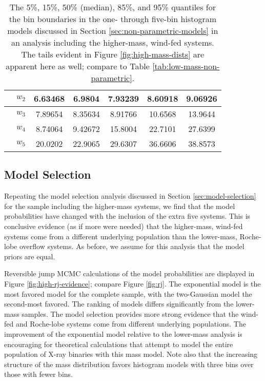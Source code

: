 \documentclass[preprint]{aastex}
\begin{document}
\begin{table}
\begin{center}
\begin{tabular}{|c|c|c|c|c|c|c|}
      \hline
      & $w_2$ & 6.63468 & 6.9804 & 7.93239 & 8.60918 & 9.06926 \\
      \hline
      & $w_3$ & 7.89654 & 8.35634 & 8.91766 & 10.6568 & 13.9644 \\
      \hline
      & $w_4$ & 8.74064 & 9.42672 & 15.8004 & 22.7101 & 27.6399 \\
      \hline
      & $w_5$ & 20.0202 & 22.9065 & 29.6307 & 36.6606 & 38.8573 \\
      \hline
    \end{tabular}
  \end{center}
  \caption{\label{tab:high-mass-non-parametric} The 5\%, 15\%, 50\%
    (median), 85\%, and 95\% quantiles for the bin boundaries in the
    one- through five-bin histogram models discussed in Section
    \ref{sec:non-parametric-models} in an 
    analysis including the higher-mass, wind-fed systems.  
    The tails evident in Figure \ref{fig:high-mass-dists} are apparent
    here as well; compare to Table \ref{tab:low-mass-non-parametric}.}
\end{table}

\subsection{Model Selection}

Repeating the model selection analysis discussed in Section
\ref{sec:model-selection} for the sample including the higher-mass
systems, we find that the model probabilities have changed with the
inclusion of the extra five systems.  This is conclusive evidence (as
if more were needed) that the higher-mass, wind-fed systems come from
a different underlying population than the lower-mass, Roche-lobe
overflow systems.  As before, we assume for this analysis that the
model priors are equal.

Reversible jump MCMC calculations of the model probabilities are
displayed in Figure \ref{fig:high-rj-evidence}; compare Figure
\ref{fig:rj}.  The exponential model is the most favored model for the
complete sample, with the two-Gaussian model the second-most favored.
The ranking of models differs significantly from the lower-mass
samples.  The model selection provides more strong evidence that the
wind-fed and Roche-lobe systems come from different underlying
populations.  The improvement of the exponential model relative to the
lower-mass analysis is encouraging for theoretical calculations that
attempt to model the entire population of X-ray binaries with this
mass model.  Note also that the increasing structure of the mass
distribution favors histogram models with three bins over those with
fewer bins.
\end{document}
